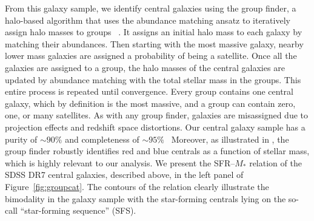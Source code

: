 \documentclass[12pt, letterpaper, preprint, tighten]{aastex62}
\newcommand{\edt}[1]{{\color{dred}{\bf} #1}}
\begin{document}
From this galaxy sample, we identify central galaxies using the 
\cite{tinker2011} group finder, a halo-based algorithm that uses 
the abundance matching ansatz to iteratively assign halo masses to 
groups~\edt{\citep[see also][]{yang2005}}. 
It assigns an initial halo mass to each galaxy by matching their 
abundances. Then starting with the most massive galaxy, nearby lower
mass galaxies are assigned a probability of being a satellite. Once all 
the galaxies are assigned to a group, the halo masses of the central galaxies 
are updated by abundance matching with the total stellar mass in the groups. 
This entire process is repeated until convergence. Every group contains one 
central galaxy, which by definition is the most massive, and a group can 
contain zero, one, or many satellites.
As with any group finder, galaxies are misassigned due to projection 
effects and redshift space distortions. Our central galaxy sample has
a purity of ${\sim}90\%$ and completeness of ${\sim}95\%$~\citep{tinker2018}
Moreover, as illustrated in \cite{campbell2015}, the \cite{tinker2011} group
finder robustly identifies red and blue centrals as a function of stellar mass, 
which is highly relevant to our analysis.  
We present the SFR--$M_*$ relation of the SDSS DR7 central galaxies, described 
above, in the left panel of Figure~\ref{fig:groupcat}. The contours of the 
relation clearly illustrate the bimodality in the galaxy sample with the 
star-forming centrals lying on the so-call ``star-forming sequence'' (SFS). 
\end{document}
